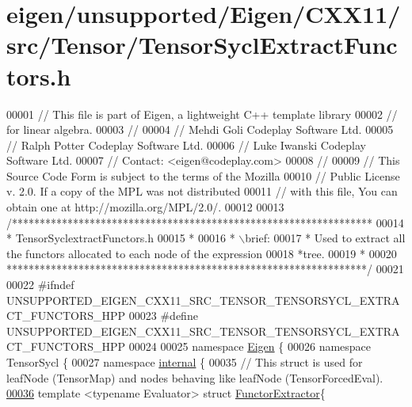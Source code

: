 \hypertarget{eigen_2unsupported_2_eigen_2_c_x_x11_2src_2_tensor_2_tensor_sycl_extract_functors_8h_source}{}\section{eigen/unsupported/\+Eigen/\+C\+X\+X11/src/\+Tensor/\+Tensor\+Sycl\+Extract\+Functors.h}
\label{eigen_2unsupported_2_eigen_2_c_x_x11_2src_2_tensor_2_tensor_sycl_extract_functors_8h_source}

\begin{DoxyCode}
00001 \textcolor{comment}{// This file is part of Eigen, a lightweight C++ template library}
00002 \textcolor{comment}{// for linear algebra.}
00003 \textcolor{comment}{//}
00004 \textcolor{comment}{// Mehdi Goli    Codeplay Software Ltd.}
00005 \textcolor{comment}{// Ralph Potter  Codeplay Software Ltd.}
00006 \textcolor{comment}{// Luke Iwanski  Codeplay Software Ltd.}
00007 \textcolor{comment}{// Contact: <eigen@codeplay.com>}
00008 \textcolor{comment}{//}
00009 \textcolor{comment}{// This Source Code Form is subject to the terms of the Mozilla}
00010 \textcolor{comment}{// Public License v. 2.0. If a copy of the MPL was not distributed}
00011 \textcolor{comment}{// with this file, You can obtain one at http://mozilla.org/MPL/2.0/.}
00012 
00013 \textcolor{comment}{/*****************************************************************}
00014 \textcolor{comment}{ * TensorSyclextractFunctors.h}
00015 \textcolor{comment}{ *}
00016 \textcolor{comment}{ * \(\backslash\)brief:}
00017 \textcolor{comment}{ *  Used to extract all the functors allocated to each node of the expression}
00018 \textcolor{comment}{*tree.}
00019 \textcolor{comment}{ *}
00020 \textcolor{comment}{*****************************************************************/}
00021 
00022 \textcolor{preprocessor}{#ifndef UNSUPPORTED\_EIGEN\_CXX11\_SRC\_TENSOR\_TENSORSYCL\_EXTRACT\_FUNCTORS\_HPP}
00023 \textcolor{preprocessor}{#define UNSUPPORTED\_EIGEN\_CXX11\_SRC\_TENSOR\_TENSORSYCL\_EXTRACT\_FUNCTORS\_HPP}
00024 
00025 \textcolor{keyword}{namespace }\hyperlink{namespace_eigen}{Eigen} \{
00026 \textcolor{keyword}{namespace }TensorSycl \{
00027 \textcolor{keyword}{namespace }\hyperlink{namespaceinternal}{internal} \{
00035 \textcolor{comment}{// This struct is used for leafNode (TensorMap) and nodes behaving like leafNode (TensorForcedEval).}
\hyperlink{struct_eigen_1_1_tensor_sycl_1_1internal_1_1_functor_extractor}{00036} \textcolor{keyword}{template} <\textcolor{keyword}{typename} Evaluator> \textcolor{keyword}{struct }\hyperlink{struct_eigen_1_1_tensor_sycl_1_1internal_1_1_functor_extractor}{FunctorExtractor}\{

\end{DoxyCode}
